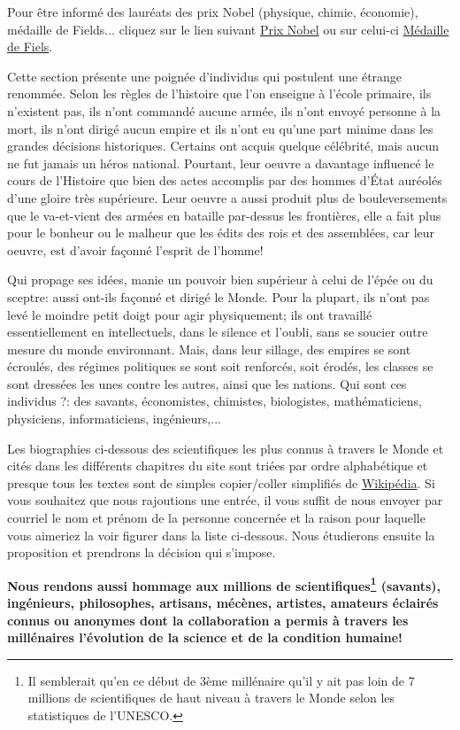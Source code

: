 Pour être informé des lauréats des prix Nobel (physique, chimie, économie), médaille de Fields... cliquez sur le lien suivant {\href{http://www.nobelprize.org/}{{\color{blue}Prix Nobel}}} ou sur celui-ci {\href{http://www.fields.utoronto.ca/aboutus/jcfields/fields_medal.html}{{\color{blue}Médaille de Fiels}}}.

Cette section présente une poignée d'individus qui postulent une étrange renommée. Selon les règles de l'histoire que l'on enseigne à l'école primaire, ils n'existent pas, ils n'ont commandé aucune armée, ils n'ont envoyé personne à la mort, ils n'ont dirigé aucun empire et ils n'ont eu qu'une part minime dans les grandes décisions historiques. Certains ont acquis quelque célébrité, mais aucun ne fut jamais un héros national. Pourtant, leur oeuvre a davantage influencé le cours de l'Histoire que bien des actes accomplis par des hommes d'État auréolés d'une gloire très supérieure. Leur oeuvre a aussi produit plus de bouleversements que le va-et-vient des armées en bataille par-dessus les frontières, elle a fait plus pour le bonheur ou le malheur que les édits des rois et des assemblées, car leur oeuvre, est d'avoir façonné l'esprit de l'homme!

Qui propage ses idées, manie un pouvoir bien supérieur à celui de l'épée ou du sceptre: aussi ont-ils façonné et dirigé le Monde. Pour la plupart, ils n'ont pas levé le moindre petit doigt pour agir physiquement; ils ont travaillé essentiellement en intellectuels, dans le silence et l'oubli, sans se soucier outre mesure du monde environnant. Mais, dans leur sillage, des empires se sont écroulés, des régimes politiques se sont soit renforcés, soit érodés, les classes se sont dressées les unes contre les autres, ainsi que les nations. Qui sont ces individus ?: des savants, économistes, chimistes, biologistes, mathématiciens, physiciens, informaticiens, ingénieurs,...

Les biographies ci-dessous des scientifiques les plus connus à travers le Monde et cités dans les différents chapitres du site sont triées par ordre alphabétique et presque tous les textes sont de simples copier/coller simplifiés de {\href{http://www.wikipedia.fr}{{\color{blue}Wikipédia}}}. Si vous souhaitez que nous rajoutions une entrée, il vous suffit de nous envoyer par courriel le nom et prénom de la personne concernée et la raison pour laquelle vous aimeriez la voir figurer dans la liste ci-dessous. Nous étudierons ensuite la proposition et prendrons la décision qui s'impose.

\textbf{Nous rendons aussi hommage aux millions de scientifiques\footnote{Il semblerait qu'en ce début de 3ème millénaire qu'il y ait pas loin de 7 millions de scientifiques de haut niveau à travers le Monde selon les statistiques de l'UNESCO.} (savants), ingénieurs, philosophes, artisans, mécènes, artistes, amateurs éclairés connus ou anonymes dont la collaboration a permis à travers les millénaires l'évolution de la science et de la condition humaine!}

